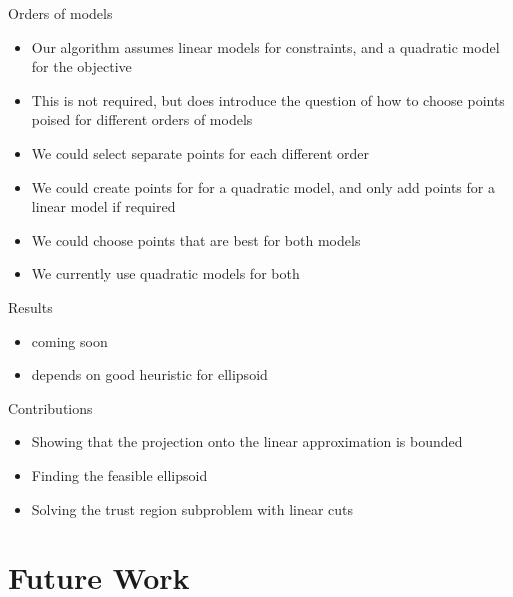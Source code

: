 \documentclass{beamer}
\begin{document}
\begin{frame}{Orders of models}
	\begin{itemize}
		\item Our algorithm assumes linear models for constraints, and a quadratic model for the objective
		\item This is not required, but does introduce the question of how to choose points poised for different orders of models
		\item We could select separate points for each different order
		\item We could create points for for a quadratic model, and only add points for a linear model if required
		\item We could choose points that are best for both models
		\item We currently use quadratic models for both
	\end{itemize}
\end{frame}



\begin{frame}{Results}
	\begin{itemize}
		\item coming soon
		\item depends on good heuristic for ellipsoid
	\end{itemize}
\end{frame}


\begin{frame}{Contributions}
	\begin{itemize}
		\item Showing that the projection onto the linear approximation is bounded
		\item Finding the feasible ellipsoid
		\item Solving the trust region subproblem with linear cuts
	\end{itemize}
\end{frame}



\section{Future Work}


\end{document}

